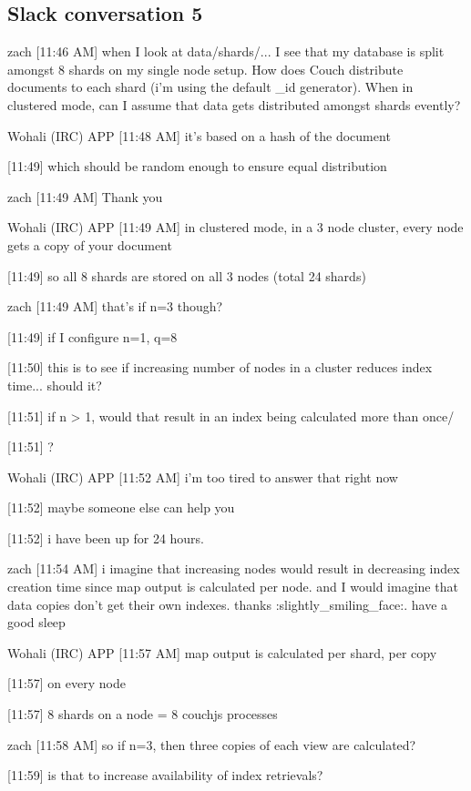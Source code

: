 \subsection{Slack conversation 5}
\label{appendix:slack5}
zach [11:46 AM]
when I look at data/shards/... I see that my database is split amongst 8 shards on my single node setup. How does Couch distribute documents to each shard (i'm using the default _id generator). When in clustered mode, can I assume that data gets distributed amongst shards evently?

Wohali (IRC) APP [11:48 AM]
it's based on a hash of the document

[11:49]
which should be random enough to ensure equal distribution

zach [11:49 AM]
Thank you

Wohali (IRC) APP [11:49 AM]
in clustered mode, in a 3 node cluster, every node gets a copy of your document

[11:49]
so all 8 shards are stored on all 3 nodes (total 24 shards)

zach [11:49 AM]
that's if n=3 though?

[11:49]
if I configure n=1, q=8

    [11:50]
this is to see if increasing number of nodes in a cluster reduces index time... should it?

[11:51]
if n > 1, would that result in an index being calculated more than once/

[11:51]
?

Wohali (IRC) APP [11:52 AM]
i'm too tired to answer that right now

    [11:52]
maybe someone else can help you

    [11:52]
i have been up for 24 hours.

zach [11:54 AM]
i imagine that increasing nodes would result in decreasing index creation time since map output is calculated per node. and I would imagine that data copies don't get their own indexes. thanks :slightly_smiling_face:. have a good sleep

Wohali (IRC) APP [11:57 AM]
map output is calculated per shard, per copy

    [11:57]
on every node

    [11:57]
8 shards on a node = 8 couchjs processes

zach [11:58 AM]
so if n=3, then three copies of each view are calculated?

[11:59]
is that to increase availability of index retrievals?

